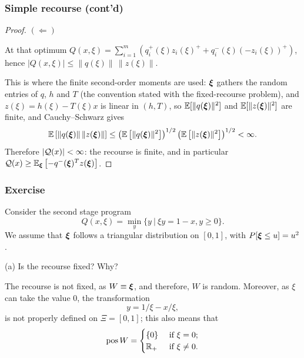 \documentclass[aspectratio=169]{beamer}
\begin{document}
\begin{frame}
\frametitle{Simple recourse (cont'd)}

\begin{proof}
{\bf $(\Leftarrow)$}

At that optimum $Q(x,\xi) = \sum_{i=1}^m \left( q_i^+(\xi)z_i(\xi)^+ + q_i^-(\xi)(-z_i(\xi))^+ \right)$, hence
$|Q(x,\xi)| \leq \|q(\xi)\| \, \|z(\xi)\|$.

\mbox{}

{\red This is where the finite second-order moments are used}: ${\boldsymbol{\xi}}$ gathers the random entries of $q$, $h$ and $T$ (the convention stated with the fixed-recourse problem), and $z(\xi) = h(\xi)-T(\xi)x$ is linear in $(h, T)$, so ${\mathbb{E}}[\|q({\boldsymbol{\xi}})\|^2]$ and ${\mathbb{E}}[\|z({\boldsymbol{\xi}})\|^2]$ are finite, and Cauchy--Schwarz gives
$$
{\mathbb{E}}\left[ \|q({\boldsymbol{\xi}})\| \, \|z({\boldsymbol{\xi}})\| \right] \leq
\left( {\mathbb{E}}\left[\|q({\boldsymbol{\xi}})\|^2\right] \right)^{1/2}
\left( {\mathbb{E}}\left[\|z({\boldsymbol{\xi}})\|^2\right] \right)^{1/2} < \infty.
$$
Therefore $|{\mathcal{Q}}(x)| < \infty$: the recourse is finite, and in particular
${\mathcal{Q}}(x) \geq {\mathbb{E}}_{{\boldsymbol{\xi}}}\left[-q^-({\boldsymbol{\xi}})^Tz({\boldsymbol{\xi}})\right]$.
\end{proof}

\end{frame}

\begin{frame}
\frametitle{Exercise}
	
Consider the second stage program
\[
Q(x, \xi) = \min_y \lbrace y \ |\ \xi y = 1-x, y \geq 0 \rbrace.
\]
We assume that ${\boldsymbol{\xi}}$ follows a triangular distribution on $[0,1]$, with $P[{\boldsymbol{\xi}} \leq u] = u^2$.
	
\mbox{}
	
{\blue (a)}
Is the recourse fixed? Why?
	
\mbox{}
	
The recourse is not fixed, as $W \equiv {\boldsymbol{\xi}}$, and therefore, $W$ is random.
Moreover, as $\xi$ can take the value 0, the transformation
\[
y = 1/\xi - x/\xi,
\]
is not properly defined on $\Xi = [0,1]$; this also means that
\[
\text{pos}\,W =
\begin{cases}
\lbrace 0 \rbrace & \text{ if } \xi = 0; \\
{\mathbb{R}}_+ & \text{ if } \xi \ne 0.
\end{cases}
\]
	
\end{frame}
\end{document}
